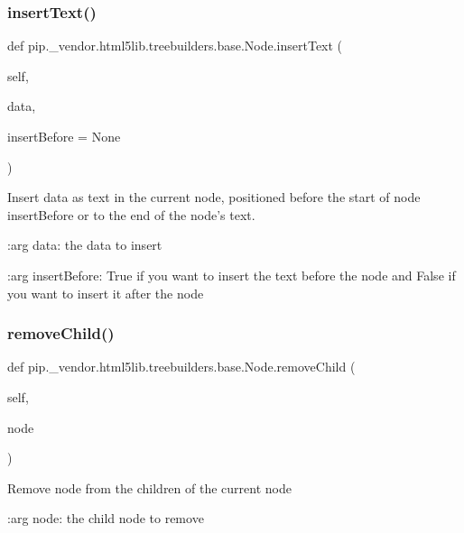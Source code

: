 \subsubsection{\texorpdfstring{insert\+Text()}{insertText()}}
{\footnotesize\ttfamily def pip.\+\_\+vendor.\+html5lib.\+treebuilders.\+base.\+Node.\+insert\+Text (\begin{DoxyParamCaption}\item[{}]{self,  }\item[{}]{data,  }\item[{}]{insert\+Before = {\ttfamily None} }\end{DoxyParamCaption})}

\begin{DoxyVerb}Insert data as text in the current node, positioned before the
start of node insertBefore or to the end of the node's text.

:arg data: the data to insert

:arg insertBefore: True if you want to insert the text before the node
    and False if you want to insert it after the node\end{DoxyVerb}
 \mbox{\label{classpip_1_1__vendor_1_1html5lib_1_1treebuilders_1_1base_1_1Node_adcd70997c9a6bf95d73986dd7f0e61b3}} 
\subsubsection{\texorpdfstring{remove\+Child()}{removeChild()}}
{\footnotesize\ttfamily def pip.\+\_\+vendor.\+html5lib.\+treebuilders.\+base.\+Node.\+remove\+Child (\begin{DoxyParamCaption}\item[{}]{self,  }\item[{}]{node }\end{DoxyParamCaption})}

\begin{DoxyVerb}Remove node from the children of the current node

:arg node: the child node to remove\end{DoxyVerb}
 \mbox{\label{classpip_1_1__vendor_1_1html5lib_1_1treebuilders_1_1base_1_1Node_af18caaac6d2663b56dd8256b39711eba}} 
